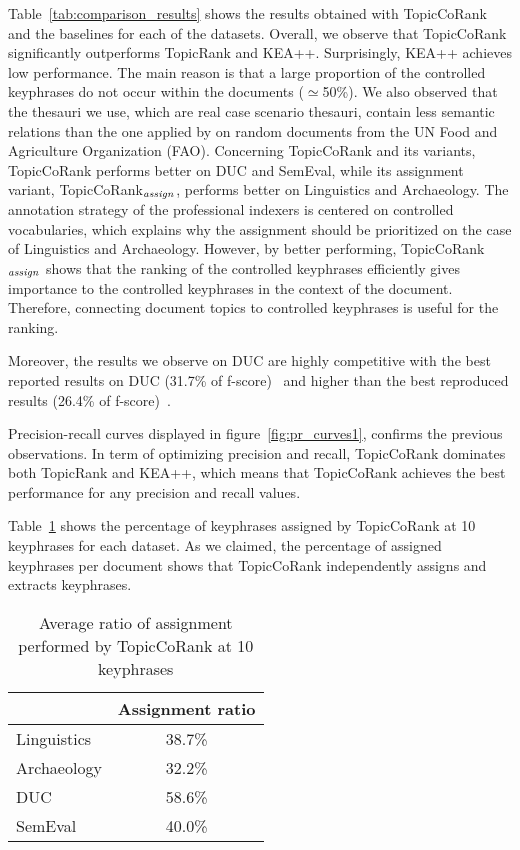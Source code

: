     Table~\ref{tab:comparison_results} shows the results obtained with
    TopicCoRank and the baselines for each of the datasets. Overall, we observe that TopicCoRank significantly outperforms TopicRank and KEA++. Surprisingly, KEA++  achieves low performance. The main reason is that a large proportion of the controlled keyphrases do not occur within the documents ($\simeq$50\%). We also observed that the thesauri we use, which are real case scenario thesauri, contain less semantic relations than the one applied by  on random documents from the UN Food and Agriculture Organization (FAO). Concerning TopicCoRank and its variants, TopicCoRank performs better on DUC and SemEval, while its assignment variant, TopicCoRank$_\textnormal{\textit{assign}}$, performs better on Linguistics and Archaeology. The annotation strategy of the professional indexers is centered on controlled vocabularies, which explains why the assignment should be prioritized on the case of Linguistics and Archaeology. However, by better performing, TopicCoRank$_\textnormal{\textit{assign}}$ shows that the ranking of the controlled keyphrases efficiently gives importance to the controlled keyphrases in the context of the document. Therefore, connecting document topics to controlled keyphrases is useful for the ranking.

    Moreover, the results we observe on DUC are highly competitive with the best reported
    results on DUC (31.7\% of f-score)~\cite{wan2008expandrank} and higher than the best
    reproduced results (26.4\% of f-score)~\cite{hassan2010conundrums}.
  
    Precision-recall curves displayed in figure~\ref{fig:pr_curves1}, confirms the
    previous observations. In term of optimizing precision and recall, TopicCoRank
    dominates both TopicRank and KEA++, which means that TopicCoRank achieves the
    best performance for any precision and recall values.
  
    Table~\ref{tab:assignment_ratio} shows the percentage of keyphrases assigned by
    TopicCoRank at 10 keyphrases for each dataset. As we claimed, the percentage of assigned keyphrases per document shows that TopicCoRank independently assigns and extracts keyphrases. 
    \begin{table}[!h]
        \centering
        \begin{tabular}{l|c}
            \toprule
            & Assignment ratio\\
            \hline
            Linguistics & 38.7\%\\
            Archaeology & 32.2\%\\
            DUC & 58.6\%\\
            SemEval & 40.0\%\\
            \bottomrule
        \end{tabular}
        \caption{Average ratio of assignment performed by TopicCoRank at 10 keyphrases
                 \label{tab:assignment_ratio}}
    \end{table}
    
